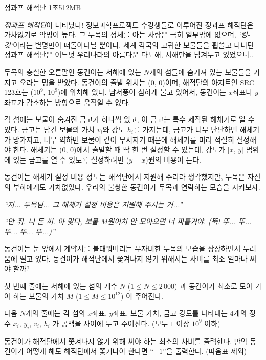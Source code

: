 \begin{problem}{정과프 해적단}
{}{}
{1초}{512MB}{}

\textit{정과프 해적단}이 나타났다! 정보과학프로젝트 수강생들로 이루어진 정과프 해적단은 가차없기로 악명이 높다. 그 두목의 정체를 아는 사람은 극히 일부밖에 없으며, \textit{`킹-갓'}이라는 별명만이 떠돌아다닐 뿐이다. 세계 각국의 고귀한 보물들을 휩쓸고 다니던 정과프 해적단은 어느덧 우리나라의 아름다운 다도해, 서해만을 남겨두고 있었으니..

두목의 충실한 오른팔인 동건이는 서해에 있는 $N$개의 섬들에 숨겨져 있는 보물들을 가지고 오라는 명을 받았다. 동건이의 출발 위치는 ($0$, $0$)이며, 해적단의 아지트인 SRC 123호는 ($10^9$, $10^9$)에 위치해 있다. 남서풍이 심하게 불고 있어서, 동건이는 $x$좌표나 $y$좌표가 감소하는 방향으로 움직일 수 없다.

각 섬에는 보물이 숨겨진 금고가 하나씩 있고, 이 금고는 특수 제작된 해체기로 열 수 있다. 금고는 담긴 보물의 가치 $v_i$와 강도 $h_i$를 가지는데, 금고가 너무 단단하면 해체기가 망가지고, 너무 약하면 보물이 같이 부서지기 때문에 해체기를 미리 적절히 설정해야 한다. 해체기는 ($0$, $0$)에서 출발할 때 딱 한 번 설정할 수 있는데, 강도가 [$x$, $y$] 범위에 있는 금고를 열 수 있도록 설정하려면 ($y-x$)원의 비용이 든다.

동건이는 해체기 설정 비용 정도는 해적단에서 지원해 주리라 생각했지만, 두목은 자신의 부하에게도 가차없었다. 우리의 불쌍한 동건이가 두목과 연락하는 모습을 지켜보자.

\textit{``저... 두목님... 그 해체기 설정 비용은 지원해 주시는 거...''}

\textit{``안 줘. 니 돈 써. 아 맞다, 보물 $M$원어치 안 모아오면 너 짜를거야. (뚝! 뚜... 뚜... 뚜... 뚜... 뚜...)''}

동건이는 눈 앞에서 계약서를 불태워버리는 무자비한 두목의 모습을 상상하면서 두려움에 떨고 있다. 동건이가 해적단에서 쫓겨나지 않기 위해서는 사비를 최소 얼마나 써야 할까?

\InputFile

첫 번째 줄에는 서해에 있는 섬의 개수 $N$ ($ 1 \le N \le 2\, 000$) 과 동건이가 최소로 모아 가야 하는 보물의 가치 $M$ ($1 \le M \le 10^{12}$) 이 주어진다.

다음 $N$개의 줄에는 각 섬의 $x$좌표, $y$좌표, 보물 가치, 금고 강도를 나타내는 4개의 정수 $x_i$, $y_i$, $v_i$, $h_i$ 가 공백을 사이에 두고 주어진다. (모두 $1$ 이상 $10^{9}$ 이하)

\OutputFile

동건이가 해적단에서 쫓겨나지 않기 위해 써야 하는 최소의 사비를 출력한다. 만약 동건이가 어떻게 해도 해적단에서 쫓겨나야 한다면 ``$-1$''을 출력한다. (따옴표 제외)

\Examples
	
\begin{example}
%
%
\end{example}

\blankpage

\end{problem}
